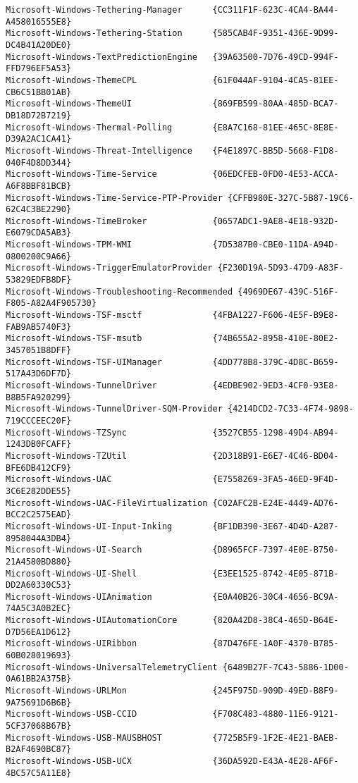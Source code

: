 \documentclass{report}
\begin{document}
\begin{lstlisting}[breaklines=true,basicstyle=\tiny]
Microsoft-Windows-Tethering-Manager      {CC311F1F-623C-4CA4-BA44-A458016555E8}
Microsoft-Windows-Tethering-Station      {585CAB4F-9351-436E-9D99-DC4B41A20DE0}
Microsoft-Windows-TextPredictionEngine   {39A63500-7D76-49CD-994F-FFD796EF5A53}
Microsoft-Windows-ThemeCPL               {61F044AF-9104-4CA5-81EE-CB6C51BB01AB}
Microsoft-Windows-ThemeUI                {869FB599-80AA-485D-BCA7-DB18D72B7219}
Microsoft-Windows-Thermal-Polling        {E8A7C168-81EE-465C-8E8E-D39A2AC1CA41}
Microsoft-Windows-Threat-Intelligence    {F4E1897C-BB5D-5668-F1D8-040F4D8DD344}
Microsoft-Windows-Time-Service           {06EDCFEB-0FD0-4E53-ACCA-A6F8BBF81BCB}
Microsoft-Windows-Time-Service-PTP-Provider {CFFB980E-327C-5B87-19C6-62C4C3BE2290}
Microsoft-Windows-TimeBroker             {0657ADC1-9AE8-4E18-932D-E6079CDA5AB3}
Microsoft-Windows-TPM-WMI                {7D5387B0-CBE0-11DA-A94D-0800200C9A66}
Microsoft-Windows-TriggerEmulatorProvider {F230D19A-5D93-47D9-A83F-53829EDFB8DF}
Microsoft-Windows-Troubleshooting-Recommended {4969DE67-439C-516F-F805-A82A4F905730}
Microsoft-Windows-TSF-msctf              {4FBA1227-F606-4E5F-B9E8-FAB9AB5740F3}
Microsoft-Windows-TSF-msutb              {74B655A2-8958-410E-80E2-3457051B8DFF}
Microsoft-Windows-TSF-UIManager          {4DD778B8-379C-4D8C-B659-517A43D6DF7D}
Microsoft-Windows-TunnelDriver           {4EDBE902-9ED3-4CF0-93E8-B8B5FA920299}
Microsoft-Windows-TunnelDriver-SQM-Provider {4214DCD2-7C33-4F74-9898-719CCCEEC20F}
Microsoft-Windows-TZSync                 {3527CB55-1298-49D4-AB94-1243DB0FCAFF}
Microsoft-Windows-TZUtil                 {2D318B91-E6E7-4C46-BD04-BFE6DB412CF9}
Microsoft-Windows-UAC                    {E7558269-3FA5-46ED-9F4D-3C6E282DDE55}
Microsoft-Windows-UAC-FileVirtualization {C02AFC2B-E24E-4449-AD76-BCC2C2575EAD}
Microsoft-Windows-UI-Input-Inking        {BF1DB390-3E67-4D4D-A287-8958044A3DB4}
Microsoft-Windows-UI-Search              {D8965FCF-7397-4E0E-B750-21A4580BD880}
Microsoft-Windows-UI-Shell               {E3EE1525-8742-4E05-871B-DD2A60330C53}
Microsoft-Windows-UIAnimation            {E0A40B26-30C4-4656-BC9A-74A5C3A0B2EC}
Microsoft-Windows-UIAutomationCore       {820A42D8-38C4-465D-B64E-D7D56EA1D612}
Microsoft-Windows-UIRibbon               {87D476FE-1A0F-4370-B785-60B028019693}
Microsoft-Windows-UniversalTelemetryClient {6489B27F-7C43-5886-1D00-0A61BB2A375B}
Microsoft-Windows-URLMon                 {245F975D-909D-49ED-B8F9-9A75691D6B6B}
Microsoft-Windows-USB-CCID               {F708C483-4880-11E6-9121-5CF37068B67B}
Microsoft-Windows-USB-MAUSBHOST          {7725B5F9-1F2E-4E21-BAEB-B2AF4690BC87}
Microsoft-Windows-USB-UCX                {36DA592D-E43A-4E28-AF6F-4BC57C5A11E8}

\end{lstlisting}
\end{document}
